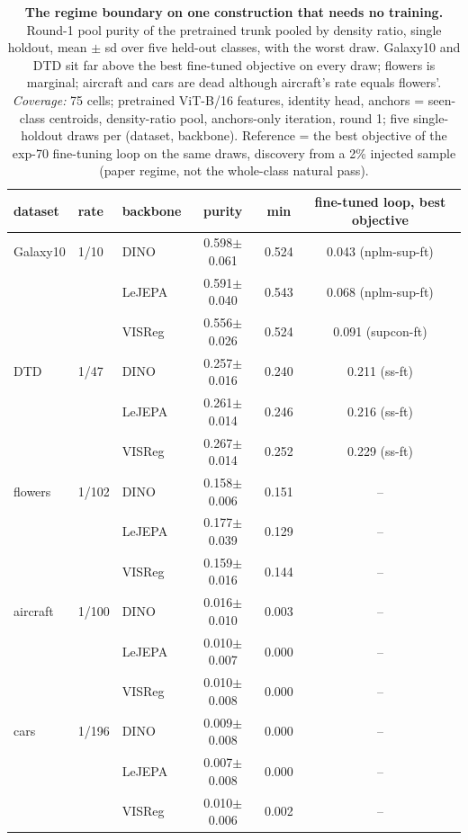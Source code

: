 \begin{table}[t]
\centering
\small
\begin{tabular}{lllccc}
\toprule
dataset & rate & backbone & purity & min & fine-tuned loop, best objective \\
\midrule
Galaxy10 & 1/10 & DINO & 0.598$\pm$0.061 & 0.524 & 0.043 (nplm-sup-ft) \\
 &  & LeJEPA & 0.591$\pm$0.040 & 0.543 & 0.068 (nplm-sup-ft) \\
 &  & VISReg & 0.556$\pm$0.026 & 0.524 & 0.091 (supcon-ft) \\
DTD & 1/47 & DINO & 0.257$\pm$0.016 & 0.240 & 0.211 (ss-ft) \\
 &  & LeJEPA & 0.261$\pm$0.014 & 0.246 & 0.216 (ss-ft) \\
 &  & VISReg & 0.267$\pm$0.014 & 0.252 & 0.229 (ss-ft) \\
flowers & 1/102 & DINO & 0.158$\pm$0.006 & 0.151 & -- \\
 &  & LeJEPA & 0.177$\pm$0.039 & 0.129 & -- \\
 &  & VISReg & 0.159$\pm$0.016 & 0.144 & -- \\
aircraft & 1/100 & DINO & 0.016$\pm$0.010 & 0.003 & -- \\
 &  & LeJEPA & 0.010$\pm$0.007 & 0.000 & -- \\
 &  & VISReg & 0.010$\pm$0.008 & 0.000 & -- \\
cars & 1/196 & DINO & 0.009$\pm$0.008 & 0.000 & -- \\
 &  & LeJEPA & 0.007$\pm$0.008 & 0.000 & -- \\
 &  & VISReg & 0.010$\pm$0.006 & 0.002 & -- \\
\bottomrule
\end{tabular}
\caption{\textbf{The regime boundary on one construction that needs no training.} Round-1 pool purity of the pretrained trunk pooled by density ratio, single holdout, mean $\pm$ sd over five held-out classes, with the worst draw. Galaxy10 and DTD sit far above the best fine-tuned objective on every draw; flowers is marginal; aircraft and cars are dead although aircraft's rate equals flowers'. \emph{Coverage:} 75 cells; pretrained ViT-B/16 features, identity head, anchors = seen-class centroids, density-ratio pool, anchors-only iteration, round 1; five single-holdout draws per (dataset, backbone). Reference = the best objective of the exp-70 fine-tuning loop on the same draws, discovery from a 2\% injected sample (paper regime, not the whole-class natural pass).}
\label{tab:zero_training}
\end{table}

